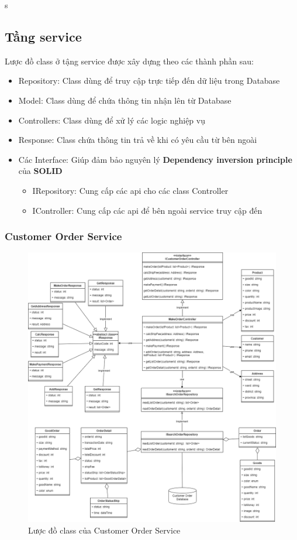 s

\subsection{Tầng service}

Lược đồ class ở tậng service được xây dựng theo các thành phần sau:
\begin{itemize}
	\item Repository: Class dùng để truy cập trực tiếp đến dữ liệu trong Database
	\item Model: Class dùng để chứa thông tin nhận lên từ Database
	\item Controllers: Class dùng để xử lý các logic nghiệp vụ
	\item Response: Class chứa thông tin trả về khi có yêu cầu từ bên ngoài
	\item Các Interface: Giúp đảm bảo nguyên lý \textbf{Dependency inversion principle} của \textbf{SOLID}
	      \begin {itemize}
	\item IRepository: Cung cấp các api cho các class Controller
	\item IController: Cung cấp các api để bên ngoài service truy cập đến
\end{itemize}
\end{itemize}



\subsubsection{Customer Order Service}
\begin{figure}[!htp]
	\centering
	\includegraphics[width=13cm]{img/Architecture/service/CustomerOrderService.png}
	\newline
	\caption{Lược đồ class của Customer Order Service}
\end{figure}

